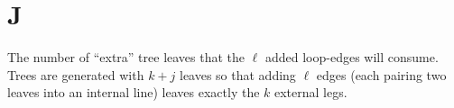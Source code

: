 \section*{J}
\begin{description}[leftmargin=0pt,style=nextline]

  \item[$j$ (leaf surplus)] The number of ``extra'' tree leaves that the $\ell$
        added loop-edges will consume. Trees are generated with $k+j$ leaves so that
        adding $\ell$ edges (each pairing two leaves into an internal line) leaves
        exactly the $k$ external legs.

\end{description}

